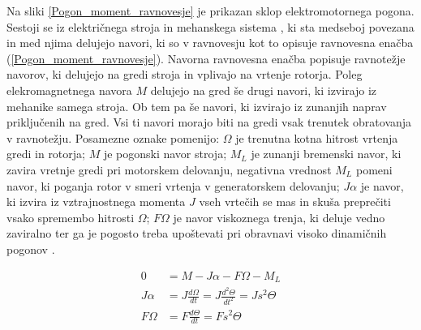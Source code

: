 \documentclass[a4paper,twoside,openright,12pt]{book}
\begin{document}
Na sliki \ref{Pogon_moment_ravnovesje} je prikazan sklop elektromotornega pogona. Sestoji se iz električnega stroja in mehanskega sistema , ki sta medseboj povezana in med njima delujejo navori, ki so  v ravnovesju kot to opisuje ravnovesna enačba (\ref{Pogon_moment_ravnovesje}). Navorna ravnovesna enačba popisuje ravnotežje navorov, ki delujejo na gredi stroja in vplivajo na vrtenje rotorja. Poleg elekromagnetnega navora $M$ delujejo na gred še drugi navori, ki izvirajo iz mehanike samega stroja. Ob tem pa še navori, ki izvirajo iz zunanjih naprav priključenih na gred. Vsi ti navori morajo biti na gredi vsak trenutek obratovanja v ravnotežju. Posamezne oznake pomenijo: $\Omega$ je trenutna kotna hitrost vrtenja gredi in rotorja; $M$ je pogonski navor stroja; $M_L$ je zunanji bremenski navor, ki zavira vretnje gredi pri motorskem delovanju, negativna vrednost $M_L$ pomeni navor, ki poganja rotor v smeri vrtenja v generatorskem delovanju; $J\alpha$ je navor, ki izvira iz vztrajnostnega momenta $J$ vseh vrtečih se mas in skuša preprečiti vsako spremembo hitrosti $\Omega$; $F\Omega$ je navor viskoznega trenja, ki deluje vedno zaviralno ter ga je pogosto treba upoštevati pri obravnavi visoko dinamičnih pogonov \cite{miljavec2009vezna}.

\begin{equation} \label{Pogon_moment_ravnovesje}
\begin{aligned}
	0  &= M-J\alpha-F\Omega-M_L\\[5pt]
	J\alpha & = J\frac{d\Omega}{dt} = J\frac{d^2\Theta}{dt^2}=Js^2\Theta\\[5pt]
	F\Omega & = F\frac{d\Theta}{dt}=Fs^2\Theta\\[5pt]
\end{aligned}
\end{equation}
\end{document}
